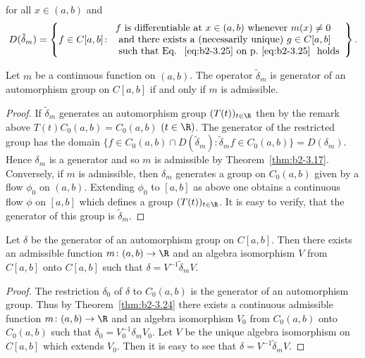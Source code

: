 for all $x \in (a,b)$ and 
\[
D(\tilde{\delta}_{m}) = \left\{ f \in C[a,b] \colon 
\begin{array}{l}
f \text{ is differentiable at } x \in (a,b) \text{ whenever } m(x) \neq 0 \\ 
\text{ and there exists a (necessarily unique) } g \in C[a,b] \\
\text{ such that Eq.~\myeqpageref{eq:b2-3.25} holds} 
\end{array} \right\}.
\]
\begin{theorem}\label{thm:b2-3.26}
%
Let $m$ be a continuous function on $(a,b)$.
The operator $\tilde{\delta}_{m}$ is generator of an automorphism group on $C[a,b]$ if and only if\/ $m$ is admissible.
\end{theorem}
\begin{proof}
If\/ $\tilde{\delta}_{m}$ generates an automorphism group $(T(t))_{t \in \R}$ then by the remark above $T(t)C_{0}(a,b) = C_{0}(a,b)$ $(t \in \R)$.
The generator of the restricted group has the domain $\{ f \in C_{0}(a,b) \cap D(\tilde{\delta}_{m}) \colon \tilde{\delta}_{m}f \in C_{0}(a,b) \} = D(\delta_{m})$.
Hence $\delta_{m}$ is a generator and so $m$ is admissible by Theorem~\ref{thm:b2-3.17}.
Conversely, if\/ $m$ is admissible, then $\delta_{m}$ generates a group on $C_{0}(a,b)$ given by a flow $\phi_{0}$ on $(a,b)$.
Extending $\phi_{0}$ to $[a,b]$ as above one obtains a continuous flow $\phi$ on $[a,b]$ which defines a group $(T(t))_{t \in \R}$.
It is easy to verify, that the generator of this group is $\tilde{\delta}_{m}$.
\end{proof}
\begin{theorem}\label{thm:b2-3.27}
%
Let $\delta$ be the generator of an automorphism group on $C[a,b]$.
Then there exists an admissible function $m \colon (a,b) \to \R$ and an algebra isomorphism $V$ from $C[a,b]$ onto $C[a,b]$ such that $\delta = V^{-1}\tilde{\delta}_{m}V$.
\end{theorem}
\begin{proof}
The restriction $\delta_{0}$ of\/ $\delta$ to $C_{0}(a,b)$ is the generator of an automorphism group.
Thus by Theorem~\ref{thm:b2-3.24} there exists a continuous admissible function $m \colon (a,b) \to \R$ and an algebra isomorphism $V_{0}$ from $C_{0}(a,b)$ onto $C_{0}(a,b)$ such that $\delta_{0} = V_{0}^{-1}\delta_{m}V_{0}$.
Let $V$ be the unique algebra isomorphism on $C[a,b]$ which extends $V_{0}$.
Then it is easy to see that $\delta = V^{-1}\tilde{\delta}_{m}V$.
\end{proof}

